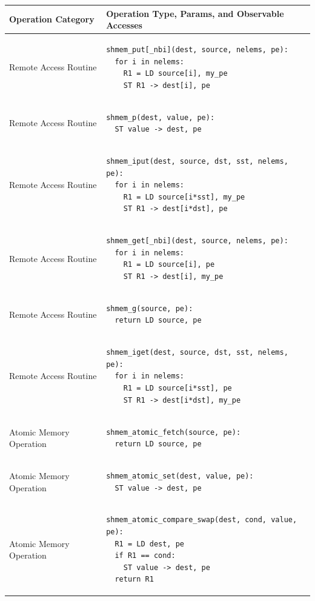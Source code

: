 
\normalsize
\begin{longtable}{|m{}|m{}|}
\hline
\textbf{Operation Category} & \textbf{Operation Type, Params, and Observable Accesses}
\tabularnewline\hline
\endhead
Remote Access Routine
    & \begin{BVerbatim}
shmem_put[_nbi](dest, source, nelems, pe):
  for i in nelems:
    R1 = LD source[i], my_pe
    ST R1 -> dest[i], pe
    \end{BVerbatim}
    \tabularnewline\hline
Remote Access Routine
    & \begin{BVerbatim}
shmem_p(dest, value, pe):
  ST value -> dest, pe
    \end{BVerbatim}
    \tabularnewline\hline
Remote Access Routine
    & \begin{BVerbatim}
shmem_iput(dest, source, dst, sst, nelems, pe):
  for i in nelems:
    R1 = LD source[i*sst], my_pe
    ST R1 -> dest[i*dst], pe
    \end{BVerbatim}
    \tabularnewline\hline
Remote Access Routine
    & \begin{BVerbatim}
shmem_get[_nbi](dest, source, nelems, pe):
  for i in nelems:
    R1 = LD source[i], pe
    ST R1 -> dest[i], my_pe
    \end{BVerbatim}
    \tabularnewline\hline
Remote Access Routine
    & \begin{BVerbatim}
shmem_g(source, pe):
  return LD source, pe
    \end{BVerbatim}
    \tabularnewline\hline
Remote Access Routine
    & \begin{BVerbatim}
shmem_iget(dest, source, dst, sst, nelems, pe):
  for i in nelems:
    R1 = LD source[i*sst], pe
    ST R1 -> dest[i*dst], my_pe
    \end{BVerbatim}
    \tabularnewline\hline
Atomic Memory Operation
    & \begin{BVerbatim}
shmem_atomic_fetch(source, pe):
  return LD source, pe
    \end{BVerbatim}
    \tabularnewline\hline
Atomic Memory Operation
    & \begin{BVerbatim}
shmem_atomic_set(dest, value, pe):
  ST value -> dest, pe
    \end{BVerbatim}
    \tabularnewline\hline
Atomic Memory Operation
    & \begin{BVerbatim}
shmem_atomic_compare_swap(dest, cond, value, pe):
  R1 = LD dest, pe
  if R1 == cond:
    ST value -> dest, pe
  return R1
    \end{BVerbatim}
    \tabularnewline\hline

\end{longtable}
